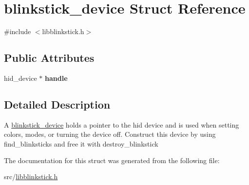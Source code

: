 \hypertarget{structblinkstick__device}{}\section{blinkstick\+\_\+device Struct Reference}
\label{structblinkstick__device}


{\ttfamily \#include $<$libblinkstick.\+h$>$}

\subsection*{Public Attributes}
\begin{DoxyCompactItemize}
\item 
\mbox{\label{structblinkstick__device_a4bb782abadc4e00570554c761a5e0768}} 
hid\+\_\+device $\ast$ {\bfseries handle}
\end{DoxyCompactItemize}


\subsection{Detailed Description}
A \hyperlink{structblinkstick__device}{blinkstick\+\_\+device} holds a pointer to the hid device and is used when setting colors, modes, or turning the device off. Construct this device by using find\+\_\+blinksticks and free it with destroy\+\_\+blinkstick 

The documentation for this struct was generated from the following file\+:\begin{DoxyCompactItemize}
\item 
src/\hyperlink{libblinkstick_8h}{libblinkstick.\+h}\end{DoxyCompactItemize}
